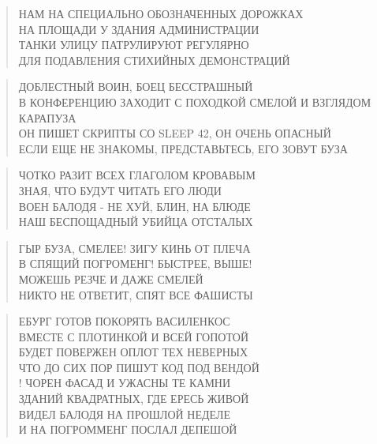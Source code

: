 \poemtitle{***}
\begin{verse}
НАМ НА СПЕЦИАЛЬНО ОБОЗНАЧЕННЫХ ДОРОЖКАХ\\
НА ПЛОЩАДИ У ЗДАНИЯ АДМИНИСТРАЦИИ\\
ТАНКИ УЛИЦУ ПАТРУЛИРУЮТ РЕГУЛЯРНО\\
ДЛЯ ПОДАВЛЕНИЯ СТИХИЙНЫХ ДЕМОНСТРАЦИЙ
\end{verse}

\poemtitle{***}
\begin{verse}
ДОБЛЕСТНЫЙ ВОИН, БОЕЦ БЕССТРАШНЫЙ\\
В КОНФЕРЕНЦИЮ ЗАХОДИТ С ПОХОДКОЙ СМЕЛОЙ И ВЗГЛЯДОМ КАРАПУЗА\\
ОН ПИШЕТ СКРИПТЫ СО SLEEP 42, ОН ОЧЕНЬ ОПАСНЫЙ\\
ЕСЛИ ЕЩЕ НЕ ЗНАКОМЫ, ПРЕДСТАВЬТЕСЬ, ЕГО ЗОВУТ БУЗА
\end{verse}

\poemtitle{***}
\begin{verse}
ЧОТКО РАЗИТ ВСЕХ ГЛАГОЛОМ КРОВАВЫМ\\
ЗНАЯ, ЧТО БУДУТ ЧИТАТЬ ЕГО ЛЮДИ\\
ВОЕН БАЛОДЯ - НЕ ХУЙ, БЛИН, НА БЛЮДЕ\\
НАШ БЕСПОЩАДНЫЙ УБИЙЦА ОТСТАЛЫХ
\end{verse}

\poemtitle{***}
\begin{verse}
ГЫР БУЗА, СМЕЛЕЕ! ЗИГУ КИНЬ ОТ ПЛЕЧА\\
В СПЯЩИЙ ПОГРОМЕНГ! БЫСТРЕЕ, ВЫШЕ!\\
МОЖЕШЬ РЕЗЧЕ И ДАЖЕ СМЕЛЕЙ\\
НИКТО НЕ ОТВЕТИТ, СПЯТ ВСЕ ФАШИСТЫ
\end{verse}

\poemtitle{***}
\begin{verse}
ЕБУРГ ГОТОВ ПОКОРЯТЬ ВАСИЛЕНКОС\\
ВМЕСТЕ С ПЛОТИНКОЙ И ВСЕЙ ГОПОТОЙ\\
БУДЕТ ПОВЕРЖЕН ОПЛОТ ТЕХ НЕВЕРНЫХ\\
ЧТО ДО СИХ ПОР ПИШУТ КОД ПОД ВЕНДОЙ\\!
ЧОРЕН ФАСАД И УЖАСНЫ ТЕ КАМНИ\\
ЗДАНИЙ КВАДРАТНЫХ, ГДЕ ЕРЕСЬ ЖИВОЙ\\
ВИДЕЛ БАЛОДЯ НА ПРОШЛОЙ НЕДЕЛЕ\\
И НА ПОГРОММЕНГ ПОСЛАЛ ДЕПЕШОЙ
\end{verse}

